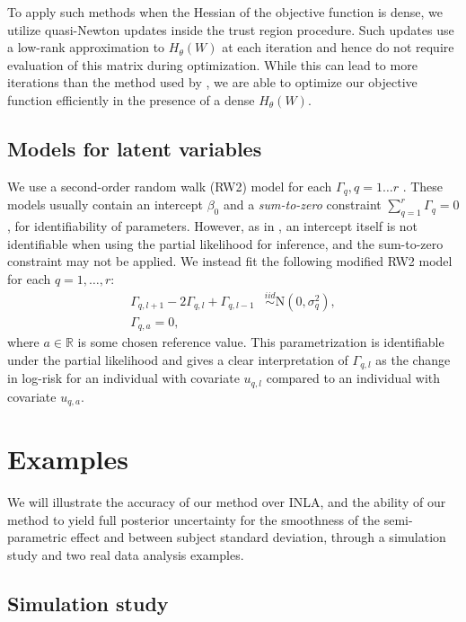 \documentclass[]{article}
\begin{document}
To apply such methods when the Hessian of the objective function is dense, we utilize quasi-Newton updates inside the trust region procedure. Such updates use a low-rank approximation to $H_{\theta}(W)$ at each iteration and hence do not require evaluation of this matrix during optimization. While this can lead to more iterations than the method used by \citet{casecross}, we are able to optimize our objective function efficiently in the presence of a dense $H_{\theta}(W)$. 

\subsection{Models for latent variables}

We use a second-order random walk (RW2) model for each $\Gamma_{q},q = 1\ldots r$ \citep{rw2}. These models usually contain an intercept $\beta_{0}$ and a \emph{sum-to-zero} constraint $\sum_{q=1}^{r}\Gamma_{q} = 0$, for identifiability of parameters. However, as in \citet{casecross}, an intercept itself is not identifiable when using the partial likelihood for inference, and the sum-to-zero constraint may not be applied. We instead fit the following modified RW2 model for each $q = 1,\ldots,r$:
\begin{equation}\begin{aligned}\label{eqn:rw2}
\Gamma_{q,l+1} - 2\Gamma_{q,l} + \Gamma_{q,l-1} &\overset{iid}{\sim}\text{N}\left( 0,\sigma^{2}_{q}\right), \\
\Gamma_{q,a} = 0,
\end{aligned}\end{equation}
where $a\in\mathbb{R}$ is some chosen reference value. This parametrization is identifiable under the partial likelihood and gives a clear interpretation of $\Gamma_{q,l}$ as the change in log-risk for an individual with covariate $u_{q,l}$ compared to an individual with covariate $u_{q,a}$. 


\section{Examples}\label{sec:example}

We will illustrate the accuracy of our method over INLA, and the ability of our method to yield full posterior uncertainty for the smoothness of the semi-parametric effect and between subject standard deviation, through a simulation study and two real data analysis examples.

\subsection{Simulation study}
\end{document}
